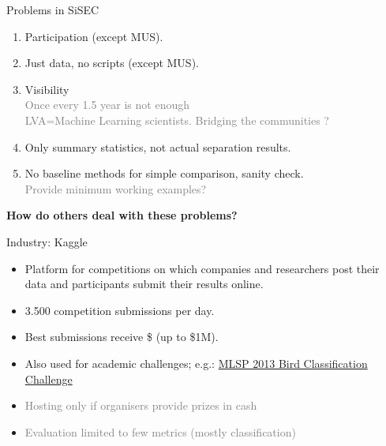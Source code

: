 \documentclass{beamer}
\begin{document}
\begin{frame}{Problems in SiSEC}

\begin{enumerate}
\def\labelenumi{\arabic{enumi}.}

\item
  Participation (except MUS).
\item
  Just data, no scripts (except MUS).
\item
  Visibility\\
  \textcolor{gray}{Once every 1.5 year is not enough\\LVA=Machine Learning scientists. Bridging the communities ?}
\item
  Only summary statistics, not actual separation results.
\item
  No baseline methods for simple comparison, sanity check.\\
  \textcolor{gray}{Provide minimum working examples?}
\end{enumerate}
\end{frame}

\begin{frame}
\textbf{How do others deal with these problems?}
\end{frame}

\begin{frame}{Industry: Kaggle}

\begin{itemize}
\item Platform for competitions on which
companies and researchers post their data and participants submit their results online. 

\item 3.500 competition submissions per day. 
\item Best submissions receive \$ (up to \$1M). 
\item Also used for academic challenges; e.g.:
\href{https://www.kaggle.com/c/mlsp-2013-birds}{MLSP 2013 Bird
Classification Challenge}
\end{itemize}

\begin{itemize}
\item \textcolor{gray}{Hosting only if organisers provide prizes in cash}
\item \textcolor{gray}{Evaluation limited to few metrics (mostly classification)}
\end{itemize}

\end{frame}
\end{document}
